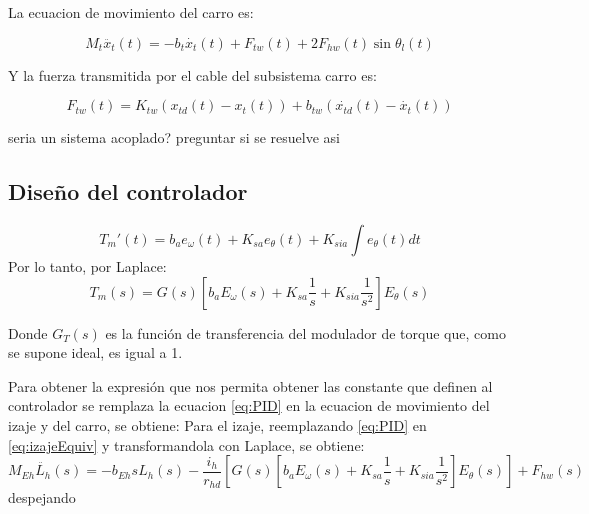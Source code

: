 \documentclass{article}
\begin{document}
            La ecuacion de movimiento del carro es:

            \begin{equation} \label{eq:Carro}
                M_t \ddot{x_{t}}(t) = - b_t \dot{x_{t}}(t) + F_{tw}(t) + 2F_{hw}(t)\sin{\theta_l(t)}
            \end{equation}

            Y la fuerza transmitida por el cable del subsistema carro es:

            \begin{equation} \label{eq:fuerzaCableCarro}
                F_{tw}(t) = K_{tw}(x_{td}(t) - x_t(t)) + b_{tw}(\dot{x_{td}}(t) - \dot{x_t}(t))
            \end{equation}

            seria un sistema acoplado? preguntar si se resuelve asi

                
        \subsection{Diseño del controlador}

            \begin{equation}\label{eq:PID}
                T_m'(t) = b_ae_\omega(t) + K_{sa} e_\theta(t) + K_{sia}\int e_\theta(t) dt
            \end{equation}
            Por lo tanto, por Laplace:
            \begin{equation}\label{eq:PID_Laplace}
                T_m(s) = G(s)[b_aE_\omega(s) + K_{sa} \frac{1}{s} + K_{sia} \frac{1}{s^2}]E_\theta(s)
            \end{equation}

            Donde \(G_T(s)\) es la función de transferencia del modulador de torque que, como se supone ideal, es igual a 1.


            Para obtener la expresión que nos permita obtener las constante que definen al controlador se remplaza la ecuacion \ref{eq:PID} en la ecuacion de movimiento del izaje y del carro, se obtiene:
            Para el izaje, reemplazando \ref{eq:PID} en \ref{eq:izajeEquiv} y transformandola con Laplace, se obtiene:
            \begin{equation}\label{eq:izajeControl}
                M_{Eh} \ddot{L_h}(s) = - b_{Eh} sL_h(s) - \frac{i_h}{r_{hd}} [G(s)[b_aE_\omega(s) + K_{sa} \frac{1}{s} + K_{sia} \frac{1}{s^2}]E_\theta(s)] + F_{hw}(s)
            \end{equation}
            despejando 
\end{document}
